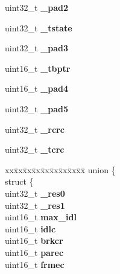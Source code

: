 \begin{DoxyCompactItemize}
\mbox{\label{structm8260SCCparms___a1a0a3327d8d8c5dc38a6737c141a3835}} 
uint32\+\_\+t {\bfseries \+\_\+pad2}
\item 
\mbox{\label{structm8260SCCparms___ac67a4d8575d87869ad209a602143cf16}} 
uint32\+\_\+t {\bfseries \+\_\+tstate}
\item 
\mbox{\label{structm8260SCCparms___ac3e89e62d194baaaeda1827a8a738e07}} 
uint32\+\_\+t {\bfseries \+\_\+pad3}
\item 
\mbox{\label{structm8260SCCparms___acd6b41c85879440982a6c0be8e9cd1fd}} 
uint16\+\_\+t {\bfseries \+\_\+tbptr}
\item 
\mbox{\label{structm8260SCCparms___ad880384ffd38056e9000453acf3825f5}} 
uint16\+\_\+t {\bfseries \+\_\+pad4}
\item 
\mbox{\label{structm8260SCCparms___a205d91c5e0f6aa7397f8fe36d6226536}} 
uint32\+\_\+t {\bfseries \+\_\+pad5}
\item 
\mbox{\label{structm8260SCCparms___a06c8d009f0e3b44feb1f0cfecc11a941}} 
uint32\+\_\+t {\bfseries \+\_\+rcrc}
\item 
\mbox{\label{structm8260SCCparms___a4907d390d1db4e4c6926b607b2e9c829}} 
uint32\+\_\+t {\bfseries \+\_\+tcrc}
\item 
\mbox{\label{structm8260SCCparms___a184989f3a321996d85028d9ba9d76fce}} 
\begin{tabbing}
xx\=xx\=xx\=xx\=xx\=xx\=xx\=xx\=xx\=\kill
union \{\\
\>struct \{\\
\>\>uint32\_t {\bfseries \_res0}\\
\>\>uint32\_t {\bfseries \_res1}\\
\>\>uint16\_t {\bfseries max\_idl}\\
\>\>uint16\_t {\bfseries idlc}\\
\>\>uint16\_t {\bfseries brkcr}\\
\>\>uint16\_t {\bfseries parec}\\
\>\>uint16\_t {\bfseries frmec}\\

\end{tabbing}
\end{DoxyCompactItemize}

